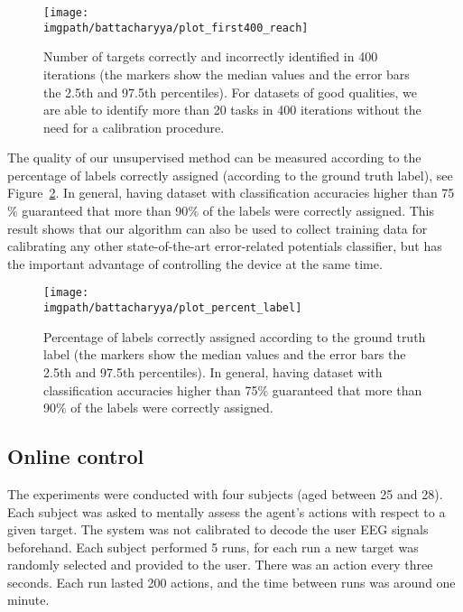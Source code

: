 \begin{figure}[!htbp]
    \centering
    \texttt{[image: \\imgpath/battacharyya/plot\_first400\_reach]} 
    \caption{Number of targets correctly and incorrectly identified in 400 iterations (the markers show the median values and the error bars the 2.5th and 97.5th percentiles). For datasets of good qualities, we are able to identify more than 20 tasks in 400 iterations without the need for a calibration procedure.}
    \label{fig:overlapavg_sum_400}
\end{figure} 

The quality of our unsupervised method can be measured according to the percentage of labels correctly assigned (according to the ground truth label), see Figure~\ref{fig:overlappercentageLabels}. In general, having dataset with classification accuracies higher than 75$\%$ guaranteed that more than 90$\%$ of the labels were correctly assigned. This result shows that our algorithm can also be used to collect training data for calibrating any other state-of-the-art error-related potentials classifier, but has the important advantage of controlling the device at the same time.

\begin{figure}[!htbp]
    \centering
        \texttt{[image: \\imgpath/battacharyya/plot\_percent\_label]}
        \caption{Percentage of labels correctly assigned according to the ground truth label (the markers show the median values and the error bars the 2.5th and 97.5th percentiles). In general, having dataset with classification accuracies higher than 75$\%$ guaranteed that more than 90$\%$ of the labels were correctly assigned.}
        \label{fig:overlappercentageLabels}
\end{figure}

\subsection{Online control}

The experiments were conducted with four subjects (aged between 25 and 28). Each subject was asked to mentally assess the agent's actions with respect to a given target. The system was not calibrated to decode the user EEG signals beforehand. Each subject performed 5 runs, for each run a new target was randomly selected and provided to the user. There was an action every three seconds. Each run lasted 200 actions, and the time between runs was around one minute.

